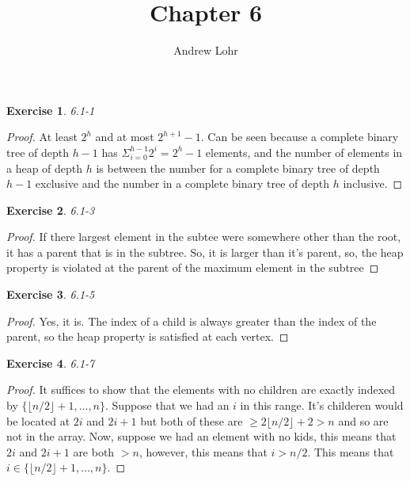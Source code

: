 \documentclass{article}
\title{Chapter 6}
\author{Andrew Lohr}
\newtheorem{th1}{Exercise}
\begin{document}
\maketitle

\begin{th1}\label{ex1}
6.1-1
\end{th1}
\begin{proof}
At least $2^h$ and at most $2^{h+1}-1$. Can be seen because a complete binary tree of depth $h-1$ has $\Sigma_{i=0}^{h-1} 2^i = 2^h-1$ elements, and the number of elements in a heap of depth $h$ is between the number for a complete binary tree of depth $h-1$ exclusive and the number in a complete binary tree of depth $h$ inclusive.
\end{proof}

\begin{th1}\label{ex2}
6.1-3
\end{th1}
\begin{proof}
If there largest element in the subtee were somewhere other than the root, it has a parent that is in the subtree. So, it is larger than it's parent, so, the heap property is violated at the parent of the maximum element in the subtree
  
\end{proof}

\begin{th1}\label{ex3}
6.1-5
\end{th1}
\begin{proof}
Yes, it is. The index of a child is always greater than the index of the parent, so the heap property is satisfied at each vertex.
\end{proof}
\begin{th1}\label{ex4}
6.1-7
\end{th1}
\begin{proof}
It suffices to show that the elements with no children are exactly indexed by $\{\lfloor n/2\rfloor+1, \ldots, n\}$. Suppose that we had an $i$ in this range. It's childeren would be located at $2i$ and $2i+1$ but both of these are $\ge 2 \lfloor n/2\rfloor +2 > n$ and so are not in the array. Now, suppose we had an element with no kids, this means that $2i$ and $2i+1$ are both $>n$, however, this means that $i > n/2$. This means that $i\in \{\lfloor n/2\rfloor+1, \ldots, n\}$.
\end{proof}
\end{document}
